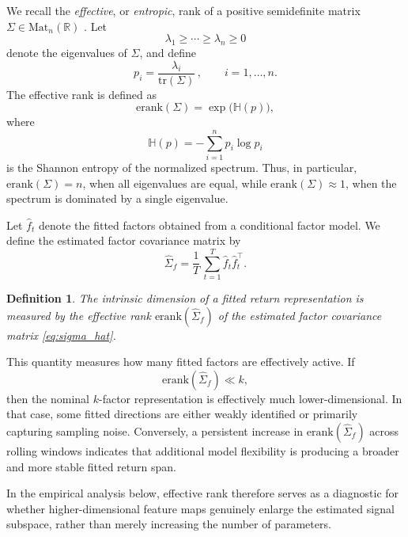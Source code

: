 \documentclass[11pt,letterpaper]{article}
\newcommand{\tr}{\mathrm{tr}}
\newcommand{\erank}{\mathrm{erank}}
\newcommand{\bR}{\mathbb{R}}
\newtheorem{definition}[theorem]{Definition}
\begin{document}
We recall the \emph{effective}, or \emph{entropic}, rank of a positive semidefinite matrix $\Sigma\in\mathrm{Mat}_n(\bR)$ \cite{RV07}. Let
\begin{equation*}
\lambda_1\geq \cdots \geq \lambda_n \geq 0
\end{equation*}
denote the eigenvalues of $\Sigma$, and define
\begin{equation}
\label{eq:effective-rank-probabilities}
p_i
=
\frac{\lambda_i}{\tr(\Sigma)}\,,
\qquad i=1,\ldots,n.
\end{equation}
The effective rank is defined as 
\begin{equation}
\label{eq:effective-rank}
\erank(\Sigma)=\exp\big(\mathbb{H}(p)\big),
\end{equation}
where
\begin{equation}
\label{eq:entropy}
\mathbb{H}(p)=-\sum_{i=1}^n p_i\log p_i
\end{equation}
is the Shannon entropy of the normalized spectrum. Thus, in particular, $\erank(\Sigma)=n$, when all eigenvalues are equal, while $\erank(\Sigma)\approx 1$, when the spectrum is dominated by a single eigenvalue.

Let $\hat f_t$ denote the fitted factors obtained from a conditional factor model. We define the estimated factor covariance matrix by
\begin{equation}
\label{eq:sigma_hat}
\hat{\Sigma}_f=\frac{1}{T}\,\sum_{t=1}^T \hat f_t \hat f_t^\top .
\end{equation}

\begin{definition}
The intrinsic dimension of a fitted return representation is measured by the effective rank $\erank(\hat\Sigma_f)$ of the estimated factor covariance matrix \eqref{eq:sigma_hat}.
\end{definition}

This quantity measures how many fitted factors are effectively active. If
\begin{equation*}
\erank(\hat\Sigma_f)\ll k,
\end{equation*}
then the nominal $k$-factor representation is effectively much lower-dimensional. In that case, some fitted directions are either weakly identified or primarily capturing sampling noise. Conversely, a persistent increase in $\erank(\hat\Sigma_f)$ across rolling windows indicates that additional model flexibility is producing a broader and more stable fitted return span.

In the empirical analysis below, effective rank therefore serves as a diagnostic for whether higher-dimensional feature maps genuinely enlarge the estimated signal subspace, rather than merely increasing the number of parameters.
\end{document}
